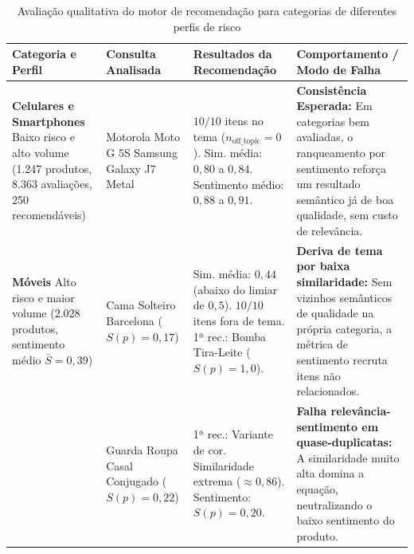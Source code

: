 \documentclass{IEEEtran}
\begin{document}
\begin{table}[htpb]
    \centering
    \caption{Avaliação qualitativa do motor de recomendação  para categorias de diferentes perfis de risco}
    \label{tab:resultados_pipeline2}
    \renewcommand{\arraystretch}{1.4}
    \begin{tabular}{>{\raggedright\arraybackslash}p{3.2cm} >{\raggedright\arraybackslash}p{3.3cm} >{\raggedright\arraybackslash}p{3.8cm} >{\raggedright\arraybackslash}p{4.7cm}}
        \toprule
        \textbf{Categoria e Perfil} & \textbf{Consulta Analisada} & \textbf{Resultados da Recomendação} & \textbf{Comportamento / Modo de Falha} \\
        \midrule
        \textbf{Celulares e Smartphones} \newline 
        Baixo risco e alto volume \newline 
        (1.247 produtos, 8.363 avaliações, 250 recomendáveis) 
        & Motorola Moto G 5S \newline 
        Samsung Galaxy J7 Metal 
        & $10/10$ itens no tema ($n_{\text{off\_topic}}=0$). \newline 
        Sim. média: $0{,}80$ a $0{,}84$. \newline 
        Sentimento médio: $0{,}88$ a $0{,}91$.
        & \textbf{Consistência Esperada:} Em categorias bem avaliadas, o ranqueamento por sentimento reforça um resultado semântico já de boa qualidade, sem custo de relevância. \\
        \midrule
        \textbf{Móveis} \newline 
        Alto risco e maior volume \newline 
        (2.028 produtos, sentimento médio $\bar{S}=0{,}39$)
        & Cama Solteiro Barcelona \newline 
        ($S(p)=0{,}17$) 
        & Sim. média: $0{,}44$ (abaixo do limiar de $0{,}5$). \newline 
        $10/10$ itens fora de tema. \newline 
        1ª rec.: Bomba Tira-Leite ($S(p)=1{,}0$).
        & \textbf{Deriva de tema por baixa similaridade:} Sem vizinhos semânticos de qualidade na própria categoria, a métrica de sentimento recruta itens não relacionados. \\
        \cmidrule{2-4}
        & Guarda Roupa Casal Conjugado \newline 
        ($S(p)=0{,}22$) 
        & 1ª rec.: Variante de cor. \newline 
        Similaridade extrema ($\approx 0{,}86$). \newline 
        Sentimento: $S(p)=0{,}20$.
        & \textbf{Falha relevância-sentimento em quase-duplicatas:} A similaridade muito alta domina a equação, neutralizando o baixo sentimento do produto. \\
        \bottomrule
    \end{tabular}
\end{table}
\end{document}
